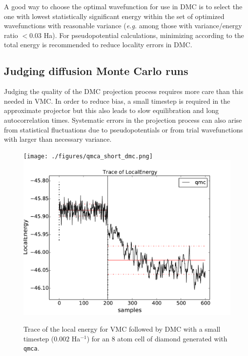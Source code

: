 A good way to choose the optimal wavefunction for use in DMC is to select 
the one with lowest statistically significant energy within the set of 
optimized wavefunctions with reasonable variance (\emph{e.g.} among 
those with variance/energy ratio $<0.03$ Ha).  For pseudopotential 
calculations, minimizing according to the total energy is recommended 
to reduce locality errors in DMC.


\subsection{Judging diffusion Monte Carlo runs}
\label{sec:qmca_judge_dmc}
Judging the quality of the DMC projection process requires more 
care than this needed in VMC.  In order to reduce bias, a small 
timestep is required in the approximate projector but this also 
leads to slow equilibration and long autocorrelation times.  
Systematic errors in the projection process can also arise from 
statistical fluctuations due to pseudopotentials or from trial 
wavefunctions with larger than necessary variance.

\begin{figure}
\begin{center}
  \ifdefined\HCode  
\texttt{[image: ./figures/qmca\_short\_dmc.png]}
\else
\includegraphics[trim = 0mm 0mm 0mm 0mm,clip,width=0.75\columnwidth]{./figures/qmca_short_dmc.pdf}
\fi
\end{center}
\caption{Trace of the local energy for VMC followed by DMC with a small timestep ($0.002$ Ha$^{-1}$) for an 8 atom cell of diamond generated with \texttt{qmca}.}
\label{fig:qmca_short_dmc}
\end{figure}

